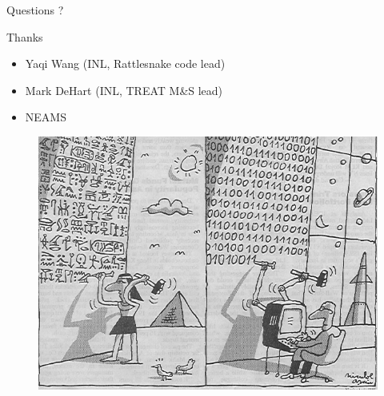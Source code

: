\documentclass[8pt]{beamer}
\begin{document}
\begin{frame}{Questions ?}


\begin{block}{Thanks}
\begin{itemize}
\item Yaqi Wang (INL, Rattlesnake code lead)
\item Mark DeHart (INL, TREAT M\&S lead)
\item NEAMS
\end{itemize}

\begin{block}{}
\begin{figure}
	\centering
	\includegraphics[scale=0.3]{./crunching.png}
\end{figure}
\end{block}

\end{block}

\end{frame}


%
%
%

%
%

\end{document}
